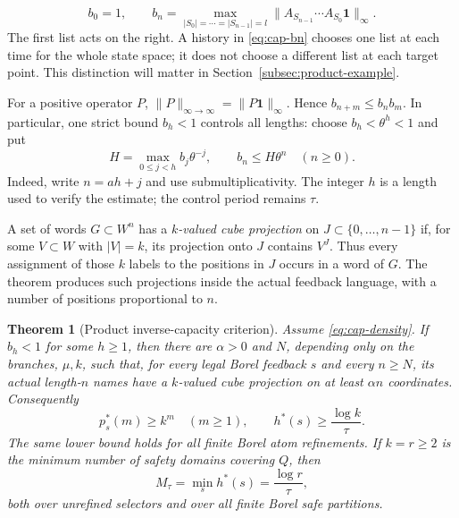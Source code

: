 \documentclass[11pt,reqno]{amsart}
\numberwithin{equation}{section}
\newtheorem{theorem}{Theorem}[section]
\theoremstyle{definition}
\theoremstyle{definition}
\newcommand{\one}{\mathbf 1}
\begin{document}
\begin{equation}\label{eq:cap-bn}
 b_0=1,\qquad
 b_n=\max_{|S_0|=\cdots=|S_{n-1}|=l}
       \|A_{S_{n-1}}\cdots A_{S_0}\one\|_\infty.
\end{equation}
The first list acts on the right. A history in \eqref{eq:cap-bn}
chooses one list at each time for the whole state space; it does not
choose a different list at each target point. This distinction will
matter in Section~\ref{subsec:product-example}.

For a positive operator $P$, $\|P\|_{\infty\to\infty}
=\|P\one\|_\infty$. Hence $b_{n+m}\le b_nb_m$. In particular,
one strict bound $b_h<1$ controls all lengths: choose
$b_h<\theta^h<1$ and put
\begin{equation}\label{eq:cap-exp}
 H=\max_{0\le j<h}b_j\theta^{-j},\qquad
 b_n\le H\theta^n\quad(n\ge0).
\end{equation}
Indeed, write $n=ah+j$ and use submultiplicativity. The integer
$h$ is a length used to verify the estimate; the control period
remains $\tau$.

A set of words $G\subset W^n$ has a \emph{$k$-valued cube projection}
on $J\subset\{0,\ldots,n-1\}$ if, for some $V\subset W$ with
$|V|=k$, its projection onto $J$ contains $V^J$. Thus every assignment
of those $k$ labels to the positions in $J$ occurs in a word of $G$.
The theorem produces such projections inside the actual feedback
language, with a number of positions proportional to $n$.


\begin{theorem}[Product inverse-capacity criterion]\label{thm:capacity-main}
Assume \eqref{eq:cap-density}. If $b_h<1$ for some $h\ge1$, then
there are $\alpha>0$ and $N$, depending only on the branches,
$\mu,k$, such that, for every legal Borel feedback $s$ and every
$n\ge N$, its actual length-$n$ names have a $k$-valued cube
projection on at least $\alpha n$ coordinates. Consequently
\begin{equation}\label{eq:cap-pattern}
 p_s^*(m)\ge k^m\quad(m\ge1),\qquad
 h^*(s)\ge\frac{\log k}{\tau}.
\end{equation}
The same lower bound holds for all finite Borel atom refinements.
If $k=r\ge2$ is the minimum number of safety domains covering $Q$,
then
\begin{equation}\label{eq:cap-M}
 M_\tau=\min_s h^*(s)=\frac{\log r}{\tau},
\end{equation}
both over unrefined selectors and over all finite Borel safe partitions.
\end{theorem}
\end{document}

